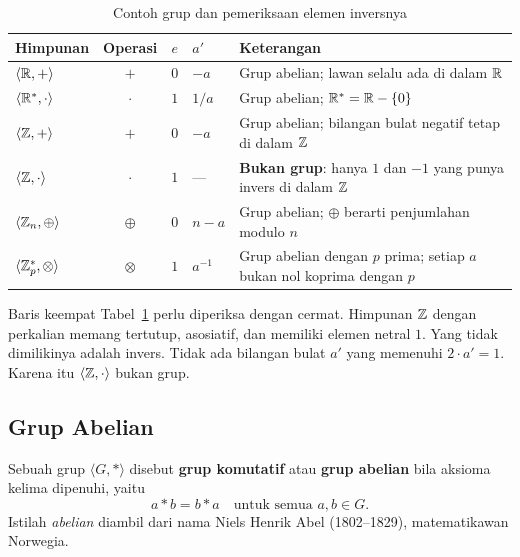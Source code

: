 \begin{table}[htbp]
    \centering
    \caption{Contoh grup dan pemeriksaan elemen inversnya}
    \label{tab:contoh-grup}
    \begin{tabularx}{\linewidth}{@{}l c c l
                                   >{\raggedright\arraybackslash}X@{}}
    \toprule
    \textbf{Himpunan} & \textbf{Operasi} & \textbf{$e$} & \textbf{$a'$} &
    \textbf{Keterangan} \\
    \midrule
    $\langle \mathbb{R}, + \rangle$ & $+$ & $0$ & $-a$ &
    Grup abelian; lawan selalu ada di dalam $\mathbb{R}$ \\
    \addlinespace
    $\langle \mathbb{R}^*, \cdot \rangle$ & $\cdot$ & $1$ & $1/a$ &
    Grup abelian; $\mathbb{R}^* = \mathbb{R} - \{0\}$ \\
    \addlinespace
    $\langle \mathbb{Z}, + \rangle$ & $+$ & $0$ & $-a$ &
    Grup abelian; bilangan bulat negatif tetap di dalam $\mathbb{Z}$ \\
    \addlinespace
    $\langle \mathbb{Z}, \cdot \rangle$ & $\cdot$ & $1$ & --- &
    \textbf{Bukan grup}: hanya $1$ dan $-1$ yang punya invers di dalam $\mathbb{Z}$ \\
    \addlinespace
    $\langle \mathbb{Z}_n, \oplus \rangle$ & $\oplus$ & $0$ & $n - a$ &
    Grup abelian; $\oplus$ berarti penjumlahan modulo $n$ \\
    \addlinespace
    $\langle \mathbb{Z}_p^*, \otimes \rangle$ & $\otimes$ & $1$ & $a^{-1}$ &
    Grup abelian dengan $p$ prima; setiap $a$ bukan nol koprima dengan $p$ \\
    \bottomrule
    \end{tabularx}
\end{table}


Baris keempat Tabel~\ref{tab:contoh-grup} perlu diperiksa dengan cermat.
Himpunan $\mathbb{Z}$ dengan perkalian memang tertutup, asosiatif, dan memiliki elemen
netral $1$. Yang tidak dimilikinya adalah invers. Tidak ada bilangan bulat
$a'$ yang memenuhi $2 \cdot a' = 1$. Karena itu $\langle \mathbb{Z}, \cdot \rangle$
bukan grup.

\subsection{Grup Abelian}
\label{subsec:grup-abelian}

Sebuah grup $\langle G, * \rangle$ disebut \textbf{grup komutatif} atau
\textbf{grup abelian} bila aksioma kelima dipenuhi, yaitu
\[
a * b = b * a \quad \text{untuk semua } a, b \in G .
\]
Istilah \emph{abelian} diambil dari nama Niels Henrik Abel (1802--1829),
matematikawan Norwegia.


